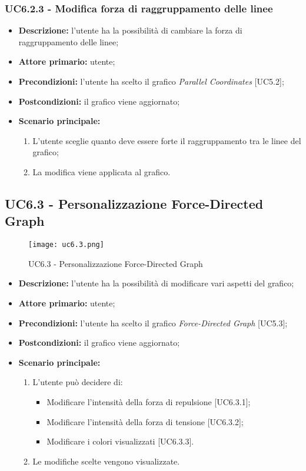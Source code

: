 \subsubsection{UC6.2.3 - Modifica forza di raggruppamento delle linee}
\begin{itemize}
  \item \textbf{Descrizione:} l'utente ha la possibilità di cambiare la forza di raggruppamento delle linee;
  \item \textbf{Attore primario:} utente;
  \item \textbf{Precondizioni:} l’utente ha scelto il grafico \textit{Parallel Coordinates} [UC5.2];
  \item \textbf{Postcondizioni:} il grafico viene aggiornato;
  \item \textbf{Scenario principale:}
    \begin{enumerate}
    \item L'utente sceglie quanto deve essere forte il raggruppamento tra le linee del grafico;
    \item La modifica viene applicata al grafico.
  \end{enumerate}
\end{itemize}

\subsection{UC6.3 - Personalizzazione Force-Directed Graph}
\begin{figure}[H]
  \centering
  \texttt{[image: uc6.3.png]}
  \caption{UC6.3 - Personalizzazione Force-Directed Graph}
\end{figure}
\begin{itemize}
    \item \textbf{Descrizione:} l'utente ha la possibilità di modificare vari aspetti del grafico;
    \item \textbf{Attore primario:} utente;
    \item \textbf{Precondizioni:} l’utente ha scelto il grafico \textit{Force-Directed Graph} [UC5.3];
    \item \textbf{Postcondizioni:} il grafico viene aggiornato;
    \item \textbf{Scenario principale:}
    \begin{enumerate}
      \item L'utente può decidere di:
    \begin{itemize}
      \item Modificare l'intensità della forza di repulsione [UC6.3.1];
      \item Modificare l'intensità della forza di tensione [UC6.3.2];
      \item Modificare i colori visualizzati [UC6.3.3].
    \end{itemize}
    \item Le modifiche scelte vengono visualizzate.
  \end{enumerate}
  \end{itemize}

